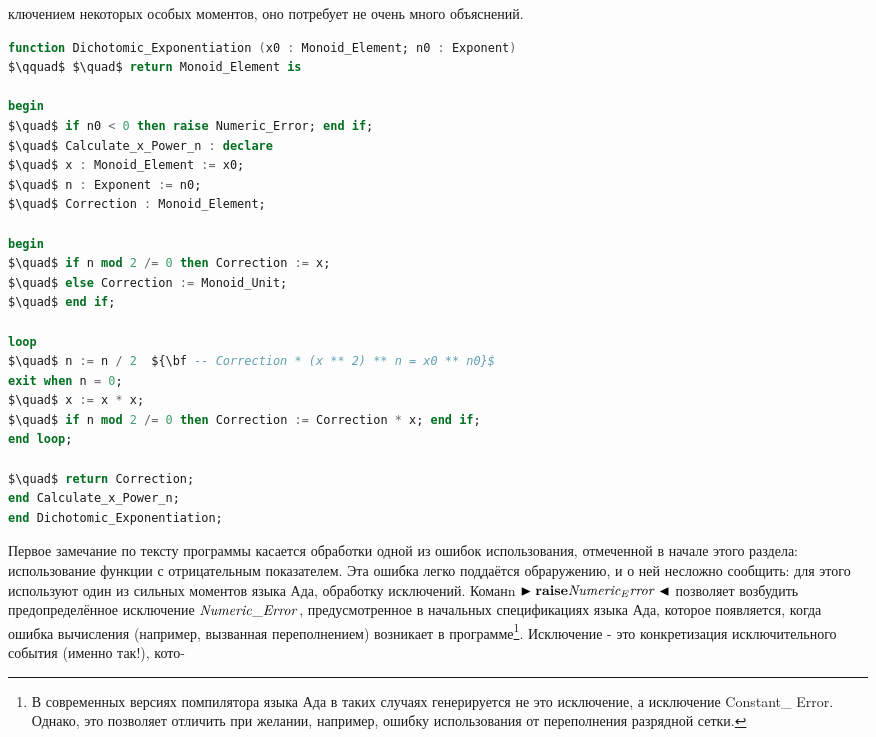 
\par ключением некоторых особых моментов, оно потребует не очень много объяснений.
\begin{lstlisting}[mathescape=true, language=Ada, basicstyle=\small]
function Dichotomic_Exponentiation (x0 : Monoid_Element; n0 : Exponent)
$\qquad$ $\quad$ return Monoid_Element is

begin
$\quad$ if n0 < 0 then raise Numeric_Error; end if;
$\quad$ Calculate_x_Power_n : declare
$\quad$ x : Monoid_Element := x0;
$\quad$ n : Exponent := n0;
$\quad$ Correction : Monoid_Element;

begin
$\quad$ if n mod 2 /= 0 then Correction := x;
$\quad$ else Correction := Monoid_Unit;
$\quad$ end if;

loop
$\quad$ n := n / 2  ${\bf -- Correction * (x ** 2) ** n = x0 ** n0}$
exit when n = 0;
$\quad$ x := x * x;
$\quad$ if n mod 2 /= 0 then Correction := Correction * x; end if;
end loop;

$\quad$ return Correction;
end Calculate_x_Power_n;
end Dichotomic_Exponentiation;

\end{lstlisting}
 
 \par Первое замечание по тексту программы касается обработки одной из ошибок использования, отмеченной в начале этого раздела: использование функции с отрицательным показателем. Эта ошибка легко поддаётся обраружению, и о ней несложно сообщить: для этого используют один из сильных моментов языка Ада, обработку исключений. Команn $\blacktriangleright {\bf raise} {\it Numeric_Error} \blacktriangleleft $ позволяет возбудить предопределённое исключение ${\it Numeric\_ Error}$, предусмотренное в начальных спецификациях языка Ада, которое появляется, когда ошибка вычисления (например, вызванная переполнением) возникает в программе\footnote{В современных версиях помпилятора языка Ада в таких случаях генерируется не это исключение, а исключение Constant\_ Error. Однако, это позволяет отличить при желании, например, ошибку использования от переполнения разрядной сетки.}. Исключение - это конкретизация исключительного события (именно так!), кото- 
 \newpage
 
